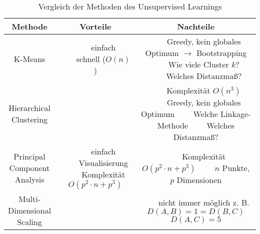 \documentclass[nonacm=true, language=german]{acmart}
\newcommand{\tabitem}{~~\llap{\textbullet}~~}
\begin{document}
\begin{table}[ht]
    \centering
    \begin{tabular}{c|c c}
        \toprule
        Methode & Vorteile  & Nachteile \\
        \midrule
        K-Means & 
        \makecell{  
            \tabitem einfach \\
            \tabitem schnell ($O(n)$)
        }   &
        \makecell{
            \tabitem Greedy, kein globales Optimum \\ $\rightarrow$ Bootstrapping \\
            \tabitem Wie viele Cluster $k$? \\
            \tabitem Welches Distanzmaß?
        } \\
        \midrule
        \makecell{Hierarchical \\ Clustering}   &   &
        \makecell{
            \tabitem Komplexität $O(n^3)$ \\
            \tabitem Greedy, kein globales Optimum \\
            \tabitem Welche Linkage-Methode \\
            \tabitem Welches Distanzmaß? \\
        } \\
        \midrule
        \makecell{Principal \\ Component \\ Analysis}   & 
        \makecell{  
            \tabitem einfach \\
            \tabitem Visualisierung \\
            \tabitem Komplexität $O(p^2 \cdot n + p^3)$
        }   &
        \makecell{
            \tabitem Komplexität $O(p^2 \cdot n + p^3)$ \\
            \tabitem $n$ Punkte, $p$ Dimensionen
        } \\
        \midrule
        \makecell{Multi- \\ Dimensional \\ Scaling} &   &
        \makecell{
            \tabitem nicht immer möglich \\ z. B. $ D(A,B) = 1 = D(B,C) $ \\ $ D(A,C) = 5 $
        } \\
        \bottomrule
    \end{tabular}
    \caption{Vergleich der Methoden des Unsupervised Learnings}
    \label{tab:unsupervised_learning}
\end{table}
\end{document}
